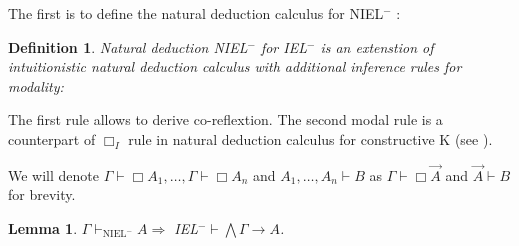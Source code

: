 \documentclass[a4paper]{article}
\newtheorem{lemma}{Lemma}
\newtheorem{defin}{Definition}
\begin{document}
  The first is to define the natural deduction calculus for NIEL$^{-}$ :

  \begin{defin} Natural deduction NIEL$^{-}$ for IEL$^{-}$ is an extenstion of intuitionistic natural deduction calculus
    with additional inference rules for modality:

  \begin{minipage}{0.5\textwidth}
    \begin{flushleft}
  	\begin{prooftree}
  \end{prooftree}
    \end{flushleft}
  \end{minipage}
  \begin{minipage}{0.5\textwidth}
    \begin{flushright}
  	\begin{prooftree}
  	\end{prooftree}
    \end{flushright}
  \end{minipage}
  \end{defin}

The first rule allows to derive co-reflextion. The second modal rule is a counterpart of $\Box_I$
rule in natural deduction calculus for constructive K (see \cite{ModalLa}).

We will denote $\Gamma \vdash \Box A_1, \dots, \Gamma \vdash \Box A_n$ and $A_1,\dots,A_n \vdash B$ as $\Gamma \vdash \Box \vec{A}$ and $\vec{A} \vdash B$ for brevity.

  \vspace{\baselineskip}

  \begin{lemma}
    $\Gamma \vdash_{\text{NIEL}^{-}} A \Rightarrow$ IEL$^{-} \vdash \bigwedge \Gamma \rightarrow A$.
  \end{lemma}
\end{document}
